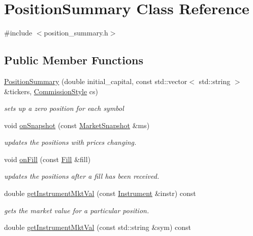 \hypertarget{classPositionSummary}{}\section{Position\+Summary Class Reference}
\label{classPositionSummary}


{\ttfamily \#include $<$position\+\_\+summary.\+h$>$}

\subsection*{Public Member Functions}
\begin{DoxyCompactItemize}
\item 
\hyperlink{classPositionSummary_a466b4163900712b20ef0c24661d6fc2f}{Position\+Summary} (double initial\+\_\+capital, const std\+::vector$<$ std\+::string $>$ \&tickers, \hyperlink{pnl__calculator_8h_ad733a3c57302a7ac3408d55dc65f2681}{Commission\+Style} cs)
\begin{DoxyCompactList}\small\item\em sets up a zero position for each symbol \end{DoxyCompactList}\item 
void \hyperlink{classPositionSummary_a4f26c2e4e1776ad2e53ada32d46095e1}{on\+Snapshot} (const \hyperlink{classMarketSnapshot}{Market\+Snapshot} \&ms)
\begin{DoxyCompactList}\small\item\em updates the positions with prices changing. \end{DoxyCompactList}\item 
void \hyperlink{classPositionSummary_a057618b9fbc23598a7353555ff280a44}{on\+Fill} (const \hyperlink{classFill}{Fill} \&fill)
\begin{DoxyCompactList}\small\item\em updates the positions after a fill has been received. \end{DoxyCompactList}\item 
double \hyperlink{classPositionSummary_acb0534c73c95999d2ff2739caedf0773}{get\+Instrument\+Mkt\+Val} (const \hyperlink{classInstrument}{Instrument} \&instr) const
\begin{DoxyCompactList}\small\item\em gets the market value for a particular position. \end{DoxyCompactList}\item 
double \hyperlink{classPositionSummary_a66ed8d8382b50aaca12fd889a2fd6c31}{get\+Instrument\+Mkt\+Val} (const std\+::string \&sym) const

\end{DoxyCompactItemize}

